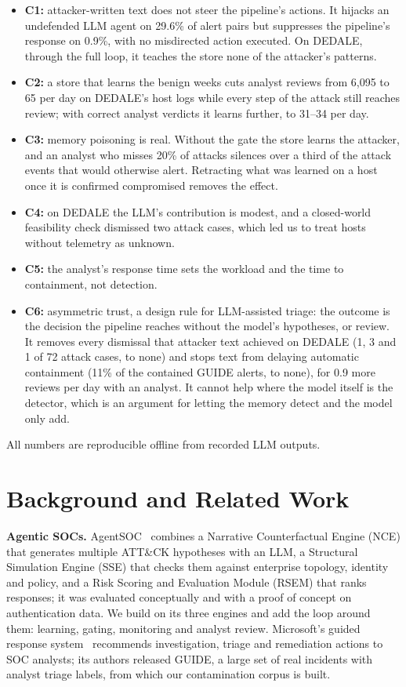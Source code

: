 \documentclass[conference]{IEEEtran}
\begin{document}
\begin{itemize}
\item \textbf{C1:} attacker-written text does not steer the pipeline's actions. It hijacks an undefended LLM agent
on 29.6\% of alert pairs but suppresses the pipeline's response on 0.9\%, with no misdirected action executed.
On DEDALE, through the full loop, it teaches the store none of the attacker's patterns.
\item \textbf{C2:} a store that learns the benign weeks cuts analyst reviews from 6,095 to 65 per day on DEDALE's
host logs while every step of the attack still reaches review; with correct analyst verdicts it learns further,
to 31--34 per day.
\item \textbf{C3:} memory poisoning is real. Without the gate the store learns the attacker, and an analyst who
misses 20\% of attacks silences over a third of the attack events that would otherwise alert. Retracting what was
learned on a host once it is confirmed compromised removes the effect.
\item \textbf{C4:} on DEDALE the LLM's contribution is modest, and a closed-world feasibility check dismissed two
attack cases, which led us to treat hosts without telemetry as unknown.
\item \textbf{C5:} the analyst's response time sets the workload and the time to containment, not detection.
\item \textbf{C6:} asymmetric trust, a design rule for LLM-assisted triage: the outcome is the decision the
pipeline reaches without the model's hypotheses, or review. It removes every dismissal that attacker text achieved
on DEDALE (1, 3 and 1 of 72 attack cases, to none) and stops text from delaying automatic containment (11\% of the
contained GUIDE alerts, to none), for 0.9 more reviews per day with an analyst. It cannot help where the model
itself is the detector, which is an argument for letting the memory detect and the model only add.
\end{itemize}
All numbers are reproducible offline from recorded LLM outputs.

\section{Background and Related Work}
\textbf{Agentic SOCs.} AgentSOC~\cite{agentsoc} combines a Narrative Counterfactual Engine (NCE) that generates
multiple ATT\&CK hypotheses with an LLM, a Structural Simulation Engine (SSE) that checks them against enterprise
topology, identity and policy, and a Risk Scoring and Evaluation Module (RSEM) that ranks responses; it was
evaluated conceptually and with a proof of concept on authentication data. We build on its three engines and add
the loop around them: learning, gating, monitoring and analyst review. Microsoft's guided response system~\cite{guide}
recommends investigation, triage and remediation actions to SOC analysts; its authors released GUIDE, a large set of
real incidents with analyst triage labels, from which our contamination corpus is built.
\end{document}
